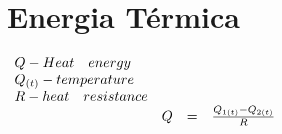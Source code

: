 \newline
\vspace{.6cm}
\newline
\begin{minipage}[l]{\linewidth}
	\section*{Energia Térmica}
	\Large
	$\begin{array}{ l l l l }
		Q - Heat \quad energy & & & \\
		Q_{(t)} - temperature & & & \\
		R - heat \quad resistance & & & \\
		& Q & = & \frac{Q_{1(t)} - Q_{2(t)}}{R}
	\end{array}$
\end{minipage}
